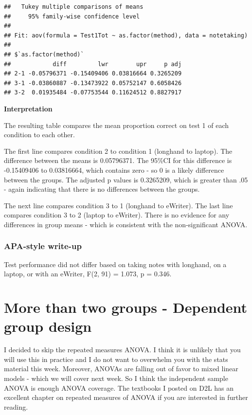 \documentclass[
]{book}
\begin{document}
\begin{verbatim}
##   Tukey multiple comparisons of means
##     95% family-wise confidence level
## 
## Fit: aov(formula = Test1Tot ~ as.factor(method), data = notetaking)
## 
## $`as.factor(method)`
##            diff         lwr        upr     p adj
## 2-1 -0.05796371 -0.15409406 0.03816664 0.3265209
## 3-1 -0.03860887 -0.13473922 0.05752147 0.6058426
## 3-2  0.01935484 -0.07753544 0.11624512 0.8827917
\end{verbatim}

\textbf{Interpretation}

The resulting table compares the mean proportion correct on test 1 of each condition to each other.

The first line compares condition 2 to condition 1 (longhand to laptop). The difference between the means is 0.05796371. The 95\%CI for this difference is -0.15409406 to 0.03816664, which contains zero - so 0 is a likely difference between the groups. The adjusted p values is 0.3265209, which is greater than .05 - again indicating that there is no differences between the groups.

The next line compares condition 3 to 1 (longhand to eWriter). The last line compares condition 3 to 2 (laptop to eWriter). There is no evidence for any differences in group means - which is consistent with the non-significant ANOVA.

\hypertarget{apa-style-write-up-1}{%
\subsubsection{APA-style write-up}\label{apa-style-write-up-1}}

Test performance did not differ based on taking notes with longhand, on a laptop, or with an eWriter, F(2, 91) = 1.073, p = 0.346.

\hypertarget{more-than-two-groups---dependent-group-design}{%
\section{More than two groups - Dependent group design}\label{more-than-two-groups---dependent-group-design}}

I decided to skip the repeated measures ANOVA. I think it is unlikely that you will use this in practice and I do not want to overwhelm you with the stats material this week. Moreover, ANOVAs are falling out of favor to mixed linear models - which we will cover next week. So I think the independent sample ANOVA is enough ANOVA coverage. The textbooks I posted on D2L has an excellent chapter on repeated measures of ANOVA if you are interested in further reading.
\end{document}
